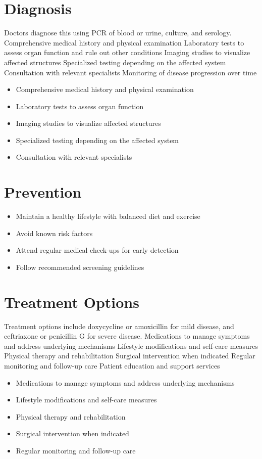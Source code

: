 \section{Diagnosis}
Doctors diagnose this using PCR of blood or urine, culture, and serology. Comprehensive medical history and physical examination Laboratory tests to assess organ function and rule out other conditions Imaging studies to visualize affected structures Specialized testing depending on the affected system Consultation with relevant specialists Monitoring of disease progression over time

\begin{itemize}[noitemsep]
  \item Comprehensive medical history and physical examination
  \item Laboratory tests to assess organ function
  \item Imaging studies to visualize affected structures
  \item Specialized testing depending on the affected system
  \item Consultation with relevant specialists
\end{itemize}
\section{Prevention}
\begin{itemize}[noitemsep]
  \item Maintain a healthy lifestyle with balanced diet and exercise
  \item Avoid known risk factors
  \item Attend regular medical check-ups for early detection
  \item Follow recommended screening guidelines
\end{itemize}
\section{Treatment Options}
Treatment options include doxycycline or amoxicillin for mild disease, and ceftriaxone or penicillin G for severe disease. Medications to manage symptoms and address underlying mechanisms Lifestyle modifications and self-care measures Physical therapy and rehabilitation Surgical intervention when indicated Regular monitoring and follow-up care Patient education and support services

\begin{itemize}[noitemsep]
  \item Medications to manage symptoms and address underlying mechanisms
  \item Lifestyle modifications and self-care measures
  \item Physical therapy and rehabilitation
  \item Surgical intervention when indicated
  \item Regular monitoring and follow-up care
\end{itemize}
